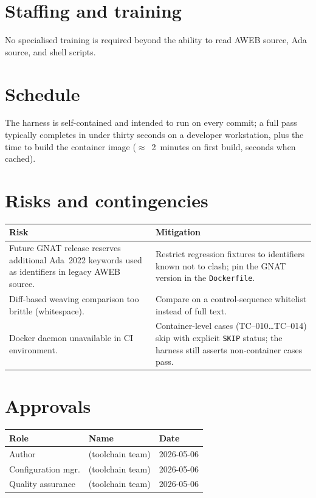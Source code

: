 \documentclass[11pt]{article}
\begin{document}
\section{Staffing and training}
No specialised training is required beyond the ability to read AWEB
source, Ada source, and shell scripts.

\section{Schedule}
The harness is self-contained and intended to run on every commit; a
full pass typically completes in under thirty seconds on a developer
workstation, plus the time to build the container image
($\approx$~2~minutes on first build, seconds when cached).

\section{Risks and contingencies}

\begin{center}
\begin{tabularx}{\linewidth}{@{}XX@{}}
\toprule
Risk & Mitigation\\
\midrule
Future GNAT release reserves additional Ada~2022 keywords used as
identifiers in legacy AWEB source. &
Restrict regression fixtures to identifiers known not to clash; pin the
GNAT version in the \texttt{Dockerfile}.\\
Diff-based weaving comparison too brittle (whitespace).
& Compare on a control-sequence whitelist instead of full text.\\
Docker daemon unavailable in CI environment.
& Container-level cases (TC--010\dots TC--014) skip with explicit
\texttt{SKIP} status; the harness still asserts non-container cases
pass.\\
\bottomrule
\end{tabularx}
\end{center}

\section{Approvals}

\begin{center}
\begin{tabular}{@{}lll@{}}
\toprule
Role               & Name             & Date\\
\midrule
Author             & (toolchain team) & 2026-05-06\\
Configuration mgr. & (toolchain team) & 2026-05-06\\
Quality assurance  & (toolchain team) & 2026-05-06\\
\bottomrule
\end{tabular}
\end{center}
\end{document}

